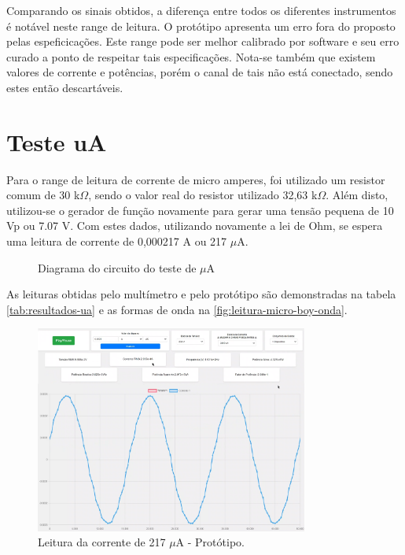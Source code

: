 Comparando os sinais obtidos, a diferença entre todos os diferentes instrumentos é notável neste range de leitura. O protótipo apresenta um erro fora do proposto pelas espeficicações. Este range pode ser melhor calibrado por software e seu erro curado a ponto de respeitar tais especificações. Nota-se também que existem valores de corrente e potências, porém o canal de tais não está conectado, sendo estes então descartáveis.

\section{Teste uA}\label{teste-ua}

Para o range de leitura de corrente de micro amperes, foi utilizado um resistor comum de 30 k$\Omega$, sendo o valor real do resistor utilizado 32,63 k$\Omega$. Além disto, utilizou-se o gerador de função novamente para gerar uma tensão pequena de 10 Vp ou 7.07 V. Com estes dados, utilizando novamente a lei de Ohm, se espera uma leitura de corrente de 0,000217 A ou 217 $\mu$A.

\begin{figure}[htb!]
    \caption{Diagrama do circuito do teste de $\mu$A}
    \label{fig:circ-ua}
    \fonte{}
\end{figure}

As leituras obtidas pelo multímetro e pelo protótipo são demonstradas na tabela \autoref{tab:resultados-ua} e as formas de onda na \autoref{fig:leitura-micro-boy-onda}.

\begin{figure}[htb!]
    \caption{Leitura da corrente de 217 $\mu$A - Protótipo.}
    \label{fig:leitura-micro-boy-onda}
    \includegraphics[width=0.8\textwidth]{figuras/leitura-micro-boy-onda.png}
    \fonte{}
\end{figure}


